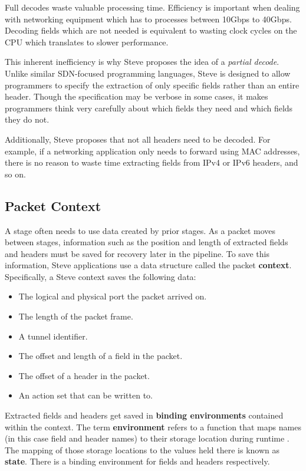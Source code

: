 Full decodes waste valuable processing time. Efficiency is important when dealing with networking equipment which has to processes between 10Gbps to 40Gbps. Decoding fields which are not needed is equivalent to wasting clock cycles on the CPU which translates to slower performance.

This inherent inefficiency is why Steve proposes the idea of a \textit{partial decode}. Unlike similar SDN-focused programming languages, Steve is designed to allow programmers to specify the extraction of only specific fields rather than an entire header. Though the specification may be verbose in some cases, it makes programmers think very carefully about which fields they need and which fields they do not.

Additionally, Steve proposes that not all headers need to be decoded. For example, if a networking application only needs to forward using MAC addresses, there is no reason to waste time extracting fields from IPv4 or IPv6 headers, and so on.

\subsection{Packet Context} \label{context_desc}

A stage often needs to use data created by prior stages. As a packet moves between stages, information such as the position and length of extracted fields and headers must be saved for recovery later in the pipeline. To save this information, Steve applications use a data structure called the packet \textbf{context}. Specifically, a Steve context saves the following data:

\begin{itemize}
\item The logical and physical port the packet arrived on.
\item The length of the packet frame.
\item A tunnel identifier.
\item The offset and length of a field in the packet.
\item The offset of a header in the packet.
\item An action set that can be written to.
\end{itemize}

Extracted fields and headers get saved in \textbf{binding environments} contained within the context. The term \textbf{environment} refers to a function that maps names (in this case field and header names) to their storage location during runtime \cite{compilers1}. The mapping of those storage locations to the values held there is known as \textbf{state}. There is a binding environment for fields and headers respectively.

